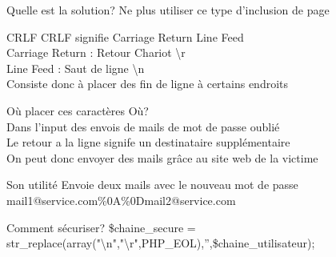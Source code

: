 \documentclass{beamer}
\begin{document}
\begin{frame}{Quelle est la solution?}
	Ne plus utiliser ce type d'inclusion de page
\end{frame}

\begin{frame}{CRLF}
	CRLF signifie Carriage Return Line Feed\\
	Carriage Return : Retour Chariot \textbackslash r\\
	Line Feed : Saut de ligne \textbackslash n\\
	Consiste donc à placer des fin de ligne à certains endroits
\end{frame}

\begin{frame}{Où placer ces caractères}
	Où?\\
	Dans l'input des envois de mails de mot de passe oublié\\
	Le retour a la ligne signife un destinataire supplémentaire\\
	On peut donc envoyer des mails grâce au site web de la victime
\end{frame}

\begin{frame}{Son utilité}
	Envoie deux mails avec le nouveau mot de passe\\
	mail1@service.com\%0A\%0Dmail2@service.com
\end{frame}

\begin{frame}{Comment sécuriser?}
	\$chaine\_secure = str\_replace(array("\textbackslash n","\textbackslash r",PHP\_EOL),'',\$chaine\_utilisateur);
\end{frame}
\end{document}

